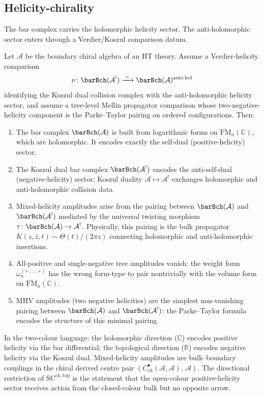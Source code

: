 \subsection{Helicity-chirality}
\label{subsec:ch-core-helicity-chirality}

The bar complex carries the holomorphic helicity sector. The anti-holomorphic sector enters through a Verdier/Koszul comparison datum.

\begin{theorem}
\label{thm:ch-core-helicity-splitting}
Let $\mathcal A$ be the boundary chiral algebra of an HT theory. Assume a Verdier-helicity
comparison
\[
\nu\colon \barBch(\mathcal A^!)\xrightarrow{\;\sim\;}
\barBch(\mathcal A)^{\mathrm{anti\text{-}hol}}
\]
identifying the Koszul dual collision complex with the anti-holomorphic helicity sector, and
assume a tree-level Mellin propagator comparison whose two-negative-helicity component is the
Parke--Taylor pairing on ordered configurations. Then:
\begin{enumerate}[label=\textup{(\roman*)}]
\item The bar complex $\barBch(\mathcal{A})$ is built from logarithmic forms on $\overline{\mathrm{FM}}_n(\mathbb{C})$, which are holomorphic. It encodes exactly the self-dual (positive-helicity) sector.
\item The Koszul dual bar complex $\barBch(\mathcal{A}^!)$ encodes the anti-self-dual (negative-helicity) sector: Koszul duality $\mathcal{A} \mapsto \mathcal{A}^!$ exchanges holomorphic and anti-holomorphic collision data.
\item Mixed-helicity amplitudes arise from the pairing between $\barBch(\mathcal{A})$ and $\barBch(\mathcal{A}^!)$ mediated by the universal twisting morphism $\tau \colon \barBch(\mathcal{A}) \to \mathcal{A}^!$. Physically, this pairing is the bulk propagator $K(z,\bar z,t) \sim \Theta(t)/(2\pi z)$ connecting holomorphic and anti-holomorphic insertions.
\item All-positive and single-negative tree amplitudes vanish: the weight form $\omega_n^{(+,\ldots,+)}$ has the wrong form-type to pair nontrivially with the volume form on $\overline{\mathrm{FM}}_n(\mathbb{C})$.
\item MHV amplitudes (two negative helicities) are the simplest non-vanishing pairing between $\barBch(\mathcal{A})$ and $\barBch(\mathcal{A}^!)$: the Parke--Taylor formula encodes the structure of this minimal pairing.
\end{enumerate}
In the two-colour language: the holomorphic direction ($\mathbb{C}$) encodes positive helicity via the bar differential; the topological direction ($\mathbb{R}$) encodes negative helicity via the Koszul dual. Mixed-helicity amplitudes are bulk--boundary couplings in the chiral derived centre pair $(C^\bullet_{\mathrm{ch}}(\mathcal{A},\mathcal{A}),\, \mathcal{A})$. The directional restriction of $\mathrm{SC}^{\mathrm{ch,top}}$ is the statement that the open-colour positive-helicity sector receives action from the closed-colour bulk but no opposite arrow.


\end{theorem}
